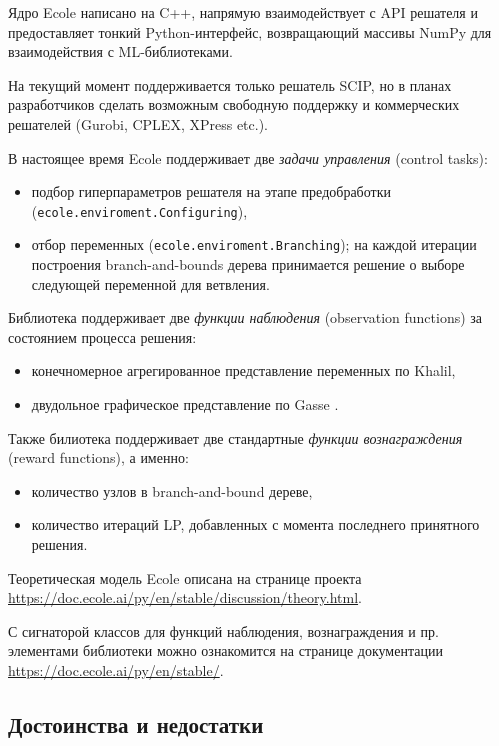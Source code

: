 \documentclass[%
	11pt,
	a4paper,
	utf8,
		]{article}
\begin{document}
Ядро Ecole написано на C++, напрямую взаимодействует с API решателя и предоставляет тонкий Python-интерфейс, возвращающий массивы NumPy для взаимодействия с ML-библиотеками.

На текущий момент поддерживается только решатель SCIP, но в планах разработчиков сделать возможным свободную поддержку и коммерческих решателей (Gurobi, CPLEX, XPress etc.).

В настоящее время Ecole поддерживает две \emph{задачи управления} (control tasks):
\begin{itemize}
	\item подбор гиперпараметров решателя на этапе предобработки (\texttt{ecole.enviroment.Configuring}),

	\item отбор переменных (\texttt{ecole.enviroment.Branching}); на каждой итерации построения branch-and-bounds дерева принимается решение о выборе следующей переменной для ветвления.
\end{itemize}

Библиотека поддерживает две \emph{функции наблюдения} (observation functions) за состоянием процесса решения:
\begin{itemize}
	\item конечномерное агрегированное представление переменных по Khalil,

	\item двудольное графическое представление по Gasse \cite{gasse:comb-opt-GCNN-2019}.
\end{itemize}

Также билиотека поддерживает две стандартные \emph{функции
вознаграждения} (reward functions), а именно:
\begin{itemize}
	\item количество узлов в branch-and-bound дереве,

	\item количество итераций LP, добавленных с момента последнего принятного решения.
\end{itemize}

Теоретическая модель Ecole описана на странице проекта \url{https://doc.ecole.ai/py/en/stable/discussion/theory.html}.

С сигнаторой классов для функций наблюдения, вознаграждения и пр. элементами библиотеки можно ознакомится на странице документации \url{https://doc.ecole.ai/py/en/stable/}.

\subsection{Достоинства и недостатки}
\end{document}
